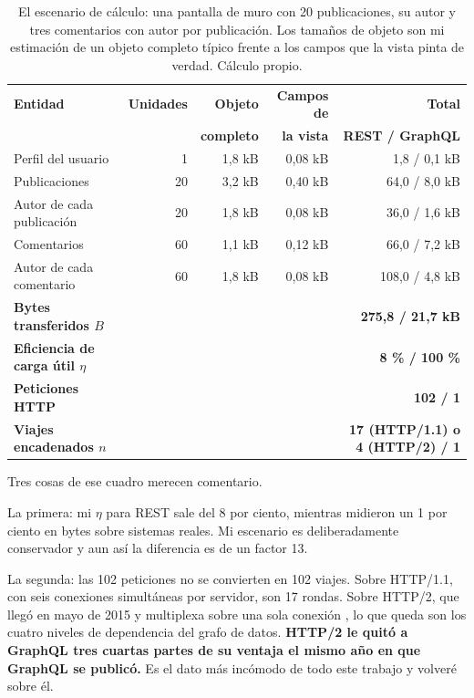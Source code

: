 \documentclass[11pt,letterpaper]{article}
\begin{document}
\begin{table}[t]
\small
\caption{El escenario de cálculo: una pantalla de muro con 20 publicaciones,
su autor y tres comentarios con autor por publicación. Los tamaños de objeto
son mi estimación de un objeto completo típico frente a los campos que la
vista pinta de verdad. Cálculo propio.}
\label{cuadro:escenario}
\begin{tabularx}{\textwidth}{@{}Xrrrr@{}}
\toprule
\textbf{Entidad} & \textbf{Unidades} & \textbf{Objeto} &
\textbf{Campos de} & \textbf{Total} \\
 & & \textbf{completo} & \textbf{la vista} & \textbf{REST / GraphQL} \\
\midrule
Perfil del usuario                &  1 & 1,8 kB & 0,08 kB &   1,8 / 0,1 kB \\
Publicaciones                     & 20 & 3,2 kB & 0,40 kB &  64,0 / 8,0 kB \\
Autor de cada publicación         & 20 & 1,8 kB & 0,08 kB &  36,0 / 1,6 kB \\
Comentarios                       & 60 & 1,1 kB & 0,12 kB &  66,0 / 7,2 kB \\
Autor de cada comentario          & 60 & 1,8 kB & 0,08 kB & 108,0 / 4,8 kB \\
\midrule
\textbf{Bytes transferidos $B$}   &    &        &         & \textbf{275,8 / 21,7 kB} \\
\textbf{Eficiencia de carga útil $\eta$} & & &            & \textbf{8 \% / 100 \%} \\
\textbf{Peticiones HTTP}          &    &        &         & \textbf{102 / 1} \\
\textbf{Viajes encadenados $n$}   &    &        &         &
  \textbf{17 (HTTP/1.1) o 4 (HTTP/2) / 1} \\
\bottomrule
\end{tabularx}
\end{table}

Tres cosas de ese cuadro merecen comentario.

La primera: mi $\eta$ para REST sale del 8 por ciento, mientras
\textcite{brito2019} midieron un 1 por ciento en bytes sobre sistemas reales.
Mi escenario es deliberadamente conservador y aun así la diferencia es de un
factor 13.

La segunda: las 102 peticiones no se convierten en 102 viajes. Sobre HTTP/1.1,
con seis conexiones simultáneas por servidor, son 17 rondas. Sobre HTTP/2, que
llegó en mayo de 2015 y multiplexa sobre una sola conexión
\parencite{rfc7540}, lo que queda son los cuatro niveles de dependencia del
grafo de datos. \textbf{HTTP/2 le quitó a GraphQL tres cuartas partes de su
ventaja el mismo año en que GraphQL se publicó.} Es el dato más incómodo de
todo este trabajo y volveré sobre él.
\end{document}
